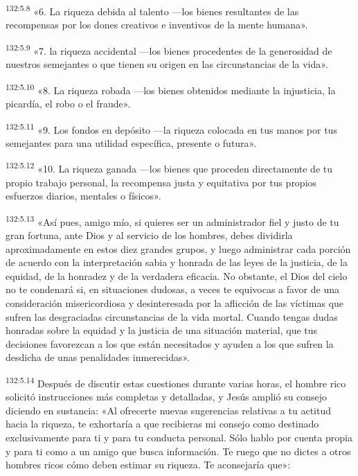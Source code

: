 \par
\textsuperscript{132:5.8} «6. La riqueza debida al talento ---los bienes resultantes de las recompensas por los dones creativos e inventivos de la mente humana».

\par
\textsuperscript{132:5.9} «7. la riqueza accidental ---los bienes procedentes de la generosidad de nuestros semejantes o que tienen su origen en las circunstancias de la vida».

\par
\textsuperscript{132:5.10} «8. La riqueza robada ---los bienes obtenidos mediante la injusticia, la picardía, el robo o el fraude».

\par
\textsuperscript{132:5.11} «9. Los fondos en depósito ---la riqueza colocada en tus manos por tus semejantes para una utilidad específica, presente o futura».

\par
\textsuperscript{132:5.12} «10. La riqueza ganada ---los bienes que proceden directamente de tu propio trabajo personal, la recompensa justa y equitativa por tus propios esfuerzos diarios, mentales o físicos».

\par
\textsuperscript{132:5.13} «Así pues, amigo mío, si quieres ser un administrador fiel y justo de tu gran fortuna, ante Dios y al servicio de los hombres, debes dividirla aproximadamente en estos diez grandes grupos, y luego administrar cada porción de acuerdo con la interpretación sabia y honrada de las leyes de la justicia, de la equidad, de la honradez y de la verdadera eficacia. No obstante, el Dios del cielo no te condenará si, en situaciones dudosas, a veces te equivocas a favor de una consideración misericordiosa y desinteresada por la aflicción de las víctimas que sufren las desgraciadas circunstancias de la vida mortal. Cuando tengas dudas honradas sobre la equidad y la justicia de una situación material, que tus decisiones favorezcan a los que están necesitados y ayuden a los que sufren la desdicha de unas penalidades inmerecidas».

\par
\textsuperscript{132:5.14} Después de discutir estas cuestiones durante varias horas, el hombre rico solicitó instrucciones más completas y detalladas, y Jesús amplió su consejo diciendo en sustancia: «Al ofrecerte nuevas sugerencias relativas a tu actitud hacia la riqueza, te exhortaría a que recibieras mi consejo como destinado exclusivamente para ti y para tu conducta personal. Sólo hablo por cuenta propia y para ti como a un amigo que busca información. Te ruego que no dictes a otros hombres ricos cómo deben estimar su riqueza. Te aconsejaría que»:

